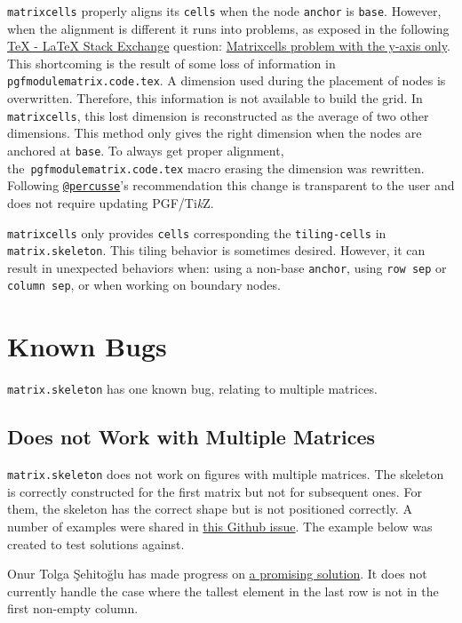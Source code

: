 \documentclass{scrartcl}
\newcommand\code\texttt
\newcommand{\TikZ}{Ti\textit{k}Z\xspace}
\begin{document}
\code{matrixcells} properly aligns its \code{cells} when the node \code{anchor} is \code{base}.
However, when the alignment is different it runs into problems, as exposed in the following \href{http://tex.stackexchange.com}{\TeX{} - \LaTeX{} Stack Exchange} question: \href{http://tex.stackexchange.com/questions/128045/matrixcells-problem-with-the-y-axis-only}{Matrixcells problem with the y-axis only}.
This shortcoming is the result of some loss of information in \code{pgfmodulematrix.code.tex}.
A dimension used during the placement of nodes is overwritten.
Therefore, this information is not available to build the grid.
In \code{matrixcells}, this lost dimension is reconstructed as the average of two other dimensions.
This method only gives the right dimension when the nodes are anchored at \code{base}.
To always get proper alignment, the~\code{pgfmodulematrix.code.tex} macro erasing the dimension was rewritten.
Following \href{http://tex.stackexchange.com/users/3235/percusse}{\code{@percusse}}'s recommendation this change is transparent to the user and does not require updating PGF/\TikZ.

\code{matrixcells} only provides \code{cells} corresponding the \code{tiling-cells} in \code{matrix.skeleton}.
This tiling behavior is sometimes desired.
However, it can result in unexpected behaviors when: using a non-base \code{anchor}, using \code{row sep} or \code{column sep}, or when working on boundary nodes.

\section{Known Bugs}

\code{matrix.skeleton} has one known bug, relating to multiple matrices.

\subsection{Does not Work with Multiple Matrices}

\code{matrix.skeleton} does not work on figures with multiple matrices.
The skeleton is correctly constructed for the first matrix but not for subsequent ones.
For them, the skeleton has the correct shape but is not positioned correctly.
A number of examples were shared in \href{https://github.com/dudebout/matrix.skeleton/issues/1}{this Github issue}.
The example below was created to test solutions against.

Onur Tolga Şehitoğlu has made progress on \href{https://github.com/dudebout/matrix.skeleton/pull/7}{a promising solution}.
It does not currently handle the case where the tallest element in the last row is not in the first non-empty column.
\end{document}
